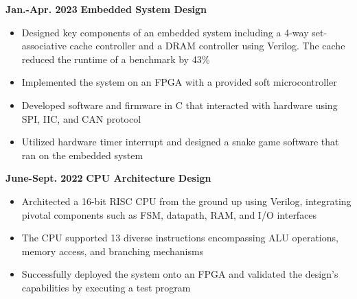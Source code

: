\documentclass[11pt,a4paper,sans]{moderncv}
\begin{document}
\cventry
{\textnormal{\textbf{Jan.-Apr. 2023}}}
{\textnormal{\textbf{Embedded System Design}}}
{}{}{}
{
    \begin{itemize}
    \item Designed key components of an embedded system including a 4-way set-associative cache controller and a DRAM controller using Verilog. The cache reduced the runtime of a benchmark by 43\%
    \item Implemented the system on an FPGA with a provided soft microcontroller 
    \item Developed software and firmware in C that interacted with hardware using SPI, IIC, and CAN protocol 
    \item Utilized hardware timer interrupt and designed a snake game software that ran on the embedded system
\end{itemize}
}

\cventry
{\textnormal{\textbf{June-Sept. 2022}}}
{\textnormal{\textbf{CPU Architecture Design}}}
{}{}{}
{
    \begin{itemize}
    \item Architected a 16-bit RISC CPU from the ground up using Verilog, integrating pivotal components such as FSM, datapath, RAM, and I/O interfaces
    \item The CPU supported 13 diverse instructions encompassing ALU operations, memory access, and branching mechanisms
    \item Successfully deployed the system onto an FPGA and validated the design's capabilities by executing a test program
\end{itemize}
}
\end{document}
